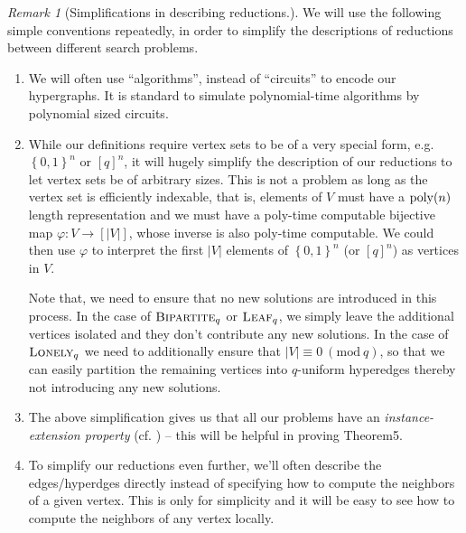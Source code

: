 \documentclass[10pt,a4paper]{article}
\theoremstyle{definition}
\theoremstyle{remark}
\newtheorem{remark}[theorem]{Remark}
\newcommand{\inparen}[1]{\left ( #1 \right )}
\renewcommand{\mod}[1]{~\inparen{\mathrm{mod}~#1}}
\def\set#1{\left\{#1\right\}}
\newcommand{\bit}{\ensuremath{\set{0,1}}}
\DeclareMathOperator*{\poly}{\ensuremath\mathrm{poly}}
\newcommand{\leaf}{\ensuremath\textsc{Leaf}}
\newcommand{\lonely}{\ensuremath\textsc{Lonely}}
\newcommand{\bipartite}{\ensuremath{\textsc{Bipartite}}}
\begin{document}
\begin{remark}[Simplifications in describing reductions.]\label{rem:simplifications}
	We will use the following simple conventions repeatedly, in order to simplify the descriptions of reductions between different search problems.
	\begin{enumerate}
						\item We will often use ``algorithms'', instead of ``circuits'' to encode our hypergraphs. It is standard to simulate polynomial-time algorithms by polynomial sized circuits.
		\item While our definitions require vertex sets to be of a very special form, e.g. $\bit^n$ or $[q]^n$, it will hugely simplify the description of our reductions to let vertex sets be of arbitrary sizes. This is not a problem as long as the vertex set is efficiently indexable, that is, elements of $V$ must have a $\poly(n)$ length representation and we must have a poly-time computable bijective map $\varphi : V \to [|V|]$, whose inverse is also poly-time computable. We could then use $\varphi$ to interpret the first $|V|$ elements of $\bit^n$ (or $[q]^n$) as vertices in $V$.

		Note that, we need to ensure that no new solutions are introduced in this process. In the case of $\bipartite_q$ or $\leaf_q$, we simply leave the additional vertices isolated and they don't contribute any new solutions. In the case of $\lonely_q$ we need to additionally ensure that $|V| \equiv 0 \mod{q}$, so that we can easily partition the remaining vertices into $q$-uniform hyperedges thereby not introducing any new solutions.
		\item The above simplification gives us that all our problems have an {\em instance-extension property} (cf. \cite{r10}) -- this will be helpful in proving Theorem5.
		\item To simplify our reductions even further, we'll often describe the edges/hyperdges directly instead of specifying how to compute the neighbors of a given vertex. This is only for simplicity and it will be easy to see how to compute the neighbors of any vertex locally.
	\end{enumerate}
\end{remark}
\end{document}
